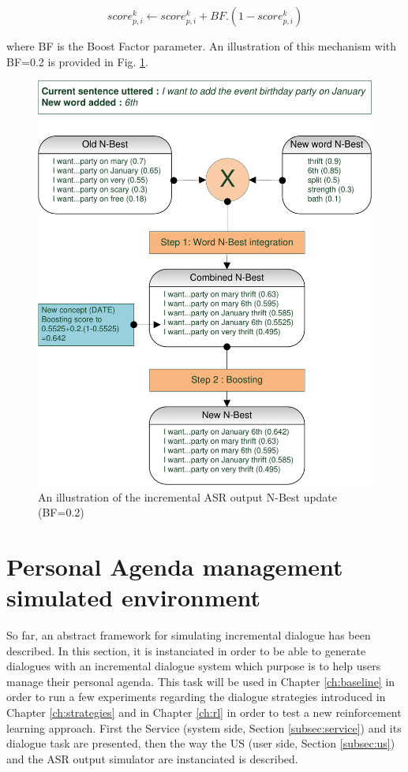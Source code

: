 						$$ score^k_{p,i} \leftarrow score^k_{p,i} + BF.(1 - score^k_{p,i}) $$
							
					where BF is the Boost Factor parameter. An illustration of this mechanism with BF=0.2 is provided in Fig. \ref{fig:asrsimu}.
					
					\begin{figure}[h]
						\centering
						\includegraphics[scale=0.75]{figures/ASRSimu.pdf}
						\caption{An illustration of the incremental ASR output N-Best update (BF=0.2)}
						\label{fig:asrsimu}
					\end{figure}

\section{Personal Agenda management simulated environment}

	So far, an abstract framework for simulating incremental dialogue has been described. In this section, it is instanciated in order to be able to generate dialogues with an incremental dialogue system which purpose is to help users manage their personal agenda. This task will be used in Chapter \ref{ch:baseline} in order to run a few experiments regarding the dialogue strategies introduced in Chapter \ref{ch:strategies} and in Chapter \ref{ch:rl} in order to test a new reinforcement learning approach. First the Service (system side, Section \ref{subsec:service}) and its dialogue task are presented, then the way the US (user side, Section \ref{subsec:us}) and the ASR output simulator are instanciated is described.
	
